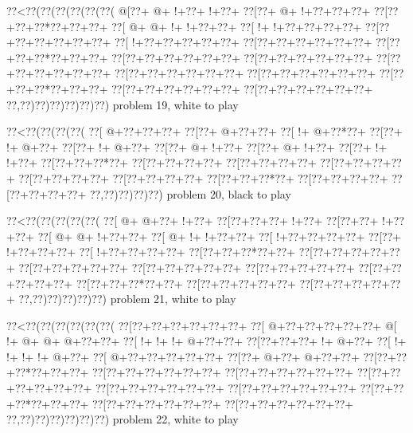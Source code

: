 \vbox{\vbox{\goo
\0??<\0??(\0??(\0??(\0??(\0??(\0??(
\- @[\0??+\- @+\- !+\0??+\- !+\0??+
\0??[\0??+\- @+\- !+\0??+\0??+\0??+
\0??[\0??+\0??+\0??*\0??+\0??+\0??+
\0??[\- @+\- @+\- !+\- !+\0??+\0??+
\0??[\- !+\- !+\0??+\0??+\0??+\0??+
\0??[\0??+\0??+\0??+\0??+\0??+\0??+
\0??[\- !+\0??+\0??+\0??+\0??+\0??+
\0??[\0??+\0??+\0??+\0??+\0??+\0??+
\0??[\0??+\0??+\0??*\0??+\0??+\0??+
\0??[\0??+\0??+\0??+\0??+\0??+\0??+
\0??[\0??+\0??+\0??+\0??+\0??+\0??+
\0??[\0??+\0??+\0??+\0??+\0??+\0??+
\0??[\0??+\0??+\0??+\0??+\0??+\0??+
\0??[\0??+\0??+\0??+\0??+\0??+\0??+
\0??[\0??+\0??+\0??*\0??+\0??+\0??+
\0??[\0??+\0??+\0??+\0??+\0??+\0??+
\0??[\0??+\0??+\0??+\0??+\0??+\0??+
\0??,\0??)\0??)\0??)\0??)\0??)\0??)
}
\hfil problem 19, white to play\hfil\break
}

\vbox{\vbox{\goo
\0??<\0??(\0??(\0??(\0??(
\0??[\- @+\0??+\0??+\0??+
\0??[\0??+\- @+\0??+\0??+
\0??[\- !+\- @+\0??*\0??+
\0??[\0??+\- !+\- @+\0??+
\0??[\0??+\- !+\- @+\0??+
\0??[\0??+\- @+\- !+\0??+
\0??[\0??+\- @+\- !+\0??+
\0??[\0??+\- !+\- !+\0??+
\0??[\0??+\0??+\0??*\0??+
\0??[\0??+\0??+\0??+\0??+
\0??[\0??+\0??+\0??+\0??+
\0??[\0??+\0??+\0??+\0??+
\0??[\0??+\0??+\0??+\0??+
\0??[\0??+\0??+\0??+\0??+
\0??[\0??+\0??+\0??*\0??+
\0??[\0??+\0??+\0??+\0??+
\0??[\0??+\0??+\0??+\0??+
\0??,\0??)\0??)\0??)\0??)
}
\hfil problem 20, black to play\hfil\break
}

\vbox{\vbox{\goo
\0??<\0??(\0??(\0??(\0??(\0??(
\0??[\- @+\- @+\0??+\- !+\0??+
\0??[\0??+\0??+\0??+\- !+\0??+
\0??[\0??+\0??+\- !+\0??+\0??+
\0??[\- @+\- @+\- !+\0??+\0??+
\0??[\- @+\- !+\- !+\0??+\0??+
\0??[\- !+\0??+\0??+\0??+\0??+
\0??[\0??+\- !+\0??+\0??+\0??+
\0??[\- !+\0??+\0??+\0??+\0??+
\0??[\0??+\0??+\0??*\0??+\0??+
\0??[\0??+\0??+\0??+\0??+\0??+
\0??[\0??+\0??+\0??+\0??+\0??+
\0??[\0??+\0??+\0??+\0??+\0??+
\0??[\0??+\0??+\0??+\0??+\0??+
\0??[\0??+\0??+\0??+\0??+\0??+
\0??[\0??+\0??+\0??*\0??+\0??+
\0??[\0??+\0??+\0??+\0??+\0??+
\0??[\0??+\0??+\0??+\0??+\0??+
\0??,\0??)\0??)\0??)\0??)\0??)
}
\hfil problem 21, white to play\hfil\break
}

\vbox{\vbox{\goo
\0??<\0??(\0??(\0??(\0??(\0??(\0??(
\0??[\0??+\0??+\0??+\0??+\0??+\0??+
\0??[\- @+\0??+\0??+\0??+\0??+\0??+
\- @[\- !+\- @+\- @+\- @+\0??+\0??+
\0??[\- !+\- !+\- !+\- @+\0??+\0??+
\0??[\0??+\0??+\0??+\- !+\- @+\0??+
\0??[\- !+\- !+\- !+\- !+\- @+\0??+
\0??[\- @+\0??+\0??+\0??+\0??+\0??+
\0??[\0??+\- @+\0??+\- @+\0??+\0??+
\0??[\0??+\0??+\0??*\0??+\0??+\0??+
\0??[\0??+\0??+\0??+\0??+\0??+\0??+
\0??[\0??+\0??+\0??+\0??+\0??+\0??+
\0??[\0??+\0??+\0??+\0??+\0??+\0??+
\0??[\0??+\0??+\0??+\0??+\0??+\0??+
\0??[\0??+\0??+\0??+\0??+\0??+\0??+
\0??[\0??+\0??+\0??*\0??+\0??+\0??+
\0??[\0??+\0??+\0??+\0??+\0??+\0??+
\0??[\0??+\0??+\0??+\0??+\0??+\0??+
\0??,\0??)\0??)\0??)\0??)\0??)\0??)
}
\hfil problem 22, white to play\hfil\break
}

